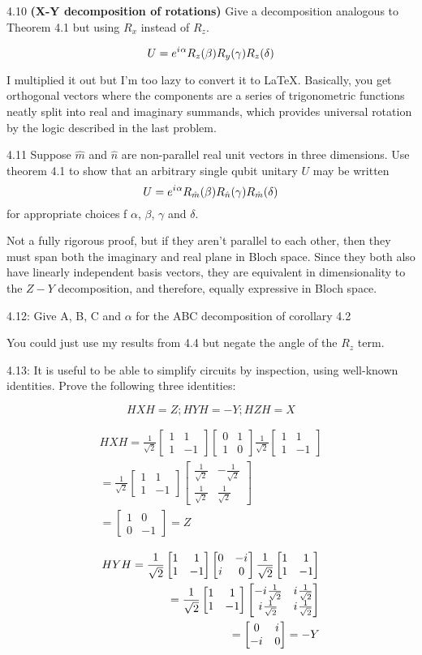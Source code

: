 \documentclass[12pt, letterpaper, twoside]{article}
\newcommand{\iu}{{i\mkern1mu}}
\newcommand{\Hadamard}{\frac{1}{\sqrt{2}}
\begin{bmatrix}
    1 & 1 \\
    1 & -1
\end{bmatrix}}
\newcommand{\twoXtwo}[4]{\begin{bmatrix}
    #1 & #3 \\
    #2 & #4
\end{bmatrix}}
\newcommand{\pauliX}{\twoXtwo{0}{1}{1}{0}}
\newcommand{\pauliY}{\twoXtwo{0}{\iu}{-\iu}{0}}
\newcommand{\sqrhat}{\frac{1}{\sqrt{2}}}
\begin{document}
4.10 \textbf{(X-Y decomposition of rotations)} Give a decomposition analogous to Theorem 4.1 but using $R_x$ instead of $R_z$.

$$
	U = e^{\iu \alpha} R_z(\beta) R_y(\gamma) R_z(\delta)
$$

I multiplied it out but I'm too lazy to convert it to \LaTeX. Basically, you get orthogonal vectors where the components are a series of trigonometric functions neatly split into real and imaginary summands, which provides universal rotation by the logic described in the last problem.

4.11 Suppose $\hat{m}$ and $\hat{n}$ are non-parallel real unit vectors in three dimensions. Use theorem 4.1 to show that an arbitrary single qubit unitary $U$ may be written
$$
	U = e^{\iu \alpha} R_{\hat{m}}(\beta) R_{\hat{n}}(\gamma) R_{\hat{m}}(\delta)
$$
for appropriate choices f $\alpha$, $\beta$, $\gamma$ and $\delta$.

Not a fully rigorous proof, but if they aren't parallel to each other, then they must span both the imaginary and real plane in Bloch space. Since they both also have linearly independent basis vectors, they are equivalent in dimensionality to the $Z-Y$ decomposition, and therefore, equally expressive in Bloch space.

4.12: Give A, B, C and $\alpha$ for the ABC decomposition of corollary 4.2

You could just use my results from 4.4 but negate the angle of the $R_z$ term.

4.13: It is useful to be able to simplify circuits by inspection, using well-known identities. Prove the following three identities:

$$
	HXH = Z; HYH = -Y; HZH = X
$$

\begin{subequations}
	\begin{align}
		HXH = \Hadamard \pauliX \Hadamard                         \\
		= \Hadamard \twoXtwo{\sqrhat}{\sqrhat}{-\sqrhat}{\sqrhat} \\
		= \twoXtwo{1}{0}{0}{-1} = Z
	\end{align}
\end{subequations}

\begin{subequations}
	\begin{align}
		HYH = \Hadamard \pauliY \Hadamard                                         \\
		= \Hadamard \twoXtwo{-\iu \sqrhat}{\iu \sqrhat}{\iu \sqrhat}{\iu \sqrhat} \\
		= \twoXtwo{0}{-\iu}{\iu}{0} = -Y
	\end{align}
\end{subequations}
\end{document}
